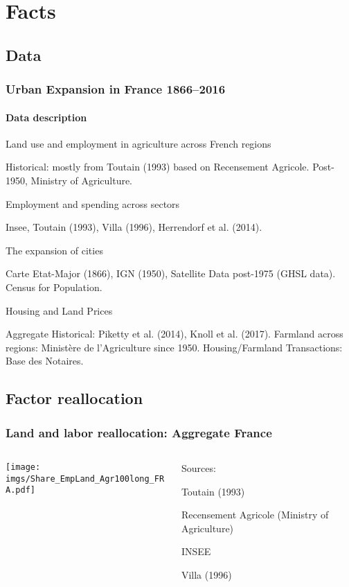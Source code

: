 \documentclass[aspectratio=169]{beamer}
\begin{document}

\section{Facts}
\subsection{Data}

\begin{v75mins}
\begin{frame}
\frametitle{Urban Expansion in France 1866--2016}
\framesubtitle{Data description}
\bi
\item Land use and employment in agriculture across French regions
\bi\item Historical: mostly from Toutain (1993) based on Recensement Agricole. Post-1950, Ministry of Agriculture. \ei
\bigskip
\item Employment and spending across sectors
\bi\item Insee, Toutain (1993), Villa (1996), Herrendorf et al. (2014).\ei
\bigskip
\item The expansion of cities
\bi\item Carte Etat-Major (1866), IGN (1950), Satellite Data post-1975 (GHSL data). Census for Population.
\ei
\bigskip
\item Housing and Land Prices
\bi\item Aggregate Historical: Piketty et al. (2014), Knoll et al. (2017). Farmland across regions: Ministère de l'Agriculture since 1950. Housing/Farmland Transactions: Base des Notaires.
\ei
\ei
\end{frame}
\end{v75mins}


\subsection{Factor reallocation}

\begin{frame}
\frametitle{Land and labor reallocation: Aggregate France}
\begin{columns}
\begin{column}{0.7\textwidth}
\texttt{[image: \\imgs/Share\_EmpLand\_Agr100long\_FRA.pdf]}
\end{column}
\begin{column}{0.3\textwidth}
Sources:
\begin{mide}
\item Toutain (1993) 
\item Recensement Agricole (Ministry of Agriculture)
\item INSEE
\item Villa (1996)
\end{mide}
\end{column}
\end{columns}
\end{frame}
\end{document}
